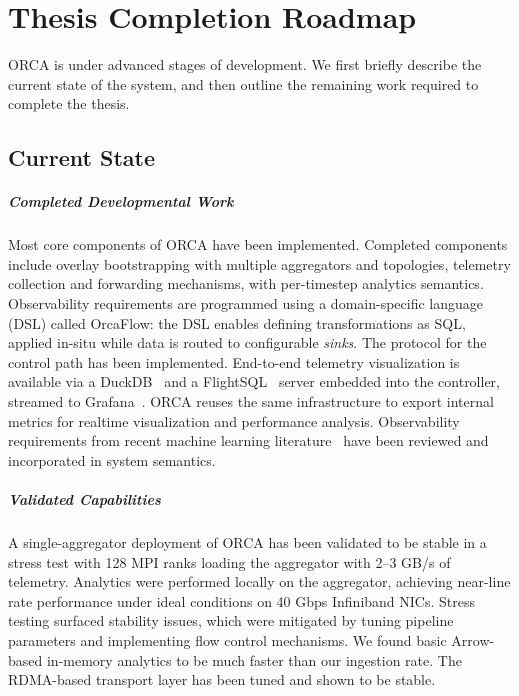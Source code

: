 \chapter{Thesis Completion Roadmap}
\label{chap:timeline}
\minitoc

ORCA is under advanced stages of development.
We first briefly describe the current state of the system, and then outline the remaining work
required to complete the thesis.

\section{Current State}

\paragraph{Completed Developmental Work}
Most core components of ORCA have been implemented.
Completed components include overlay bootstrapping with multiple aggregators and topologies,
telemetry collection and forwarding mechanisms, with per-timestep analytics semantics.
Observability requirements are programmed using a domain-specific language (DSL) called OrcaFlow:
the DSL enables defining transformations as SQL, applied in-situ while data is routed to
configurable \emph{sinks}.
The \twopc{} protocol for the control path has been implemented.
End-to-end telemetry visualization is available via a DuckDB~\cite{Raasv2019:DuckDB} and a
FlightSQL~\cite{:ArrowFlightSQL} server embedded into the controller, streamed to
Grafana~\cite{:GrafanaDashboard}.
ORCA reuses the same infrastructure to export internal metrics for realtime visualization and
performance analysis.
Observability requirements from recent machine learning
literature~\cite{Jiang2025:TrainCheck} have been reviewed and incorporated in system
semantics.

\paragraph{Validated Capabilities}
A single-aggregator deployment of ORCA has been validated to be stable in a stress test with 128
MPI ranks loading the aggregator with 2--3 GB/s of telemetry.
Analytics were performed locally on the aggregator, achieving near-line rate performance under
ideal conditions on 40 Gbps Infiniband NICs.
Stress testing surfaced stability issues, which were mitigated by tuning pipeline parameters and
implementing flow control mechanisms.
We found basic Arrow-based in-memory analytics to be much faster than our ingestion rate.
The RDMA-based transport layer has been tuned and shown to be stable.


